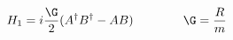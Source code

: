 \begin{equation}
H_1=i\frac{\G}{ 2} (A^\dagger B^\dagger -AB)\qquad \qquad \G =\frac{R}{m}     
\label{eq:ham3}
\end{equation}

